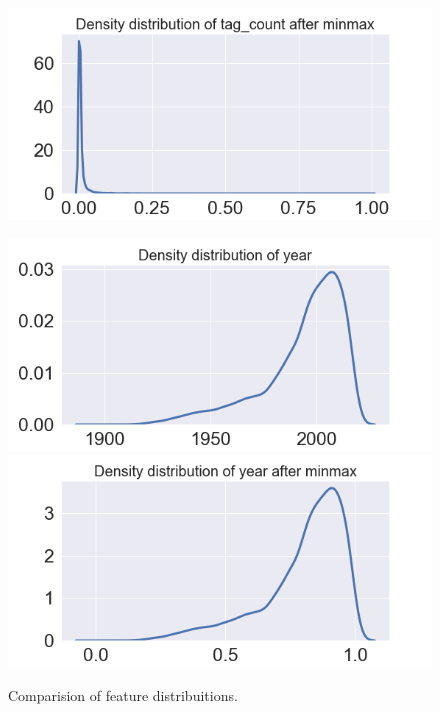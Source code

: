 \documentclass[../main]{subfiles}
\begin{document}
\begin{figure}[htb]
\begin{minipage}[t]{.19\linewidth}
        \includegraphics[width=\linewidth]{figures/minmax_tag_count.png}
    \end{minipage}  
    \begin{minipage}[t]{.19\linewidth}
        \centering
        \includegraphics[width=\linewidth]{figures/original_year.png}
        \includegraphics[width=\linewidth]{figures/minmax_year.png}
    \end{minipage}    
    \label{fig:distribuition_features}
    \caption{Comparision of feature distribuitions.}
\end{figure}
\end{document}
